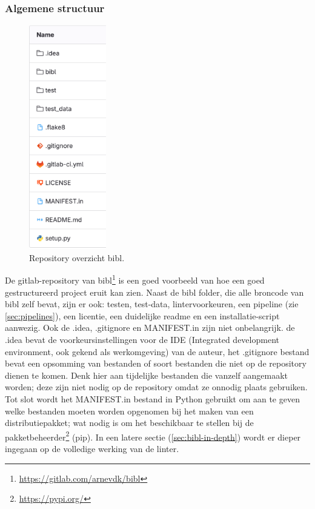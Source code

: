 \subsubsection{Algemene structuur}
\begin{figure}[ht]
    \centering
    \includegraphics[width=0.3\textwidth]{./files/bibl_repo.png}
    \caption[bibl repository]{Repository overzicht bibl.}
    \label{fig:bibl_repo}
\end{figure}

De gitlab-repository van bibl\footnote{\url{https://gitlab.com/arnevdk/bibl}} is een goed voorbeeld van hoe een goed gestructureerd project eruit kan zien. Naast de bibl folder, die alle broncode van bibl zelf bevat, zijn er ook: testen, test-data, lintervoorkeuren, een pipeline (zie \ref{sec:pipelines}), een licentie, een duidelijke readme en een installatie-script aanwezig. Ook de .idea, .gitignore en MANIFEST.in zijn niet onbelangrijk. de .idea bevat de voorkeursinstellingen voor de IDE (Integrated development environment, ook gekend als werkomgeving) van de auteur, het .gitignore bestand bevat een opsomming van bestanden of soort bestanden die niet op de repository dienen te komen. Denk hier aan tijdelijke bestanden die vanzelf aangemaakt worden; deze zijn niet nodig op de repository omdat ze onnodig plaats gebruiken. Tot slot wordt het MANIFEST.in bestand in Python gebruikt om aan te geven welke bestanden moeten worden opgenomen bij het maken van een distributiepakket; wat nodig is om het beschikbaar te stellen bij de pakketbeheerder\footnote{\url{https://pypi.org/}} (pip). In een latere sectie (\ref{sec:bibl-in-depth}) wordt er dieper ingegaan op de volledige werking van de linter.

